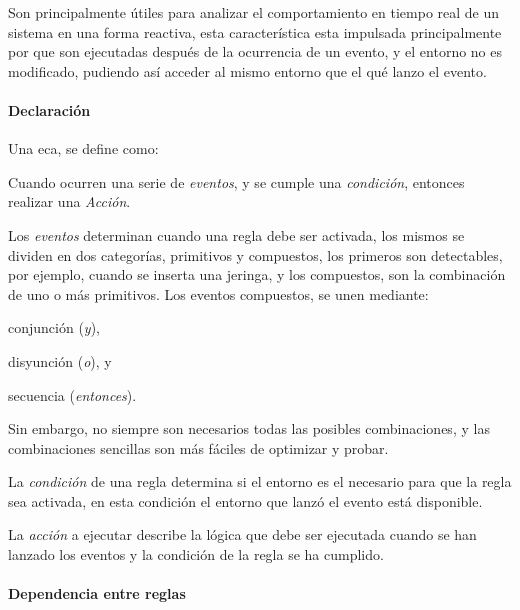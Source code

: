 Son principalmente útiles para analizar el comportamiento en tiempo real de un
sistema en una forma
reactiva\cite{bailey2004event,de2001eca,bailey2002analysis}, esta característica
esta impulsada principalmente por que son ejecutadas después de la ocurrencia de
un evento, y el entorno no es modificado, pudiendo así acceder al mismo entorno
que el qué lanzo el evento.


\paragraph{Declaración}

Una \gls{eca}, se define como\cite{bailey2004event,behrends2006combining}:

\begin{displayquote}
	 Cuando ocurren una serie de \emph{eventos}, y se cumple una
	 \emph{condición}, entonces realizar una \emph{Acción}.
\end{displayquote}

Los \emph{eventos} determinan cuando una regla debe ser activada, los mismos se
dividen en dos categorías\cite{behrends2006combining}, primitivos y compuestos,
los primeros son detectables, por ejemplo, cuando se inserta una jeringa, y los
compuestos, son la combinación de uno o más
primitivos\cite{bailey2004event,behrends2006combining}. Los eventos
compuestos, se unen mediante:
\begin{enumerate*}[label=\itshape\alph*\upshape)]
\item conjunción (\emph{y}),
\item disyunción (\emph{o}), y
\item secuencia (\emph{entonces}).
\end{enumerate*}
Sin embargo, no siempre son necesarios todas las posibles combinaciones, y las
combinaciones sencillas son más fáciles de optimizar y
probar\cite{bailey2004event}.

La \emph{condición} de una regla determina si el entorno es el necesario para que la
regla sea activada, en esta condición el entorno que lanzó el evento está
disponible.

La \emph{acción} a ejecutar describe la lógica que debe ser ejecutada cuando se han
lanzado los eventos y la condición de la regla se ha cumplido.

\paragraph{Dependencia entre reglas}

